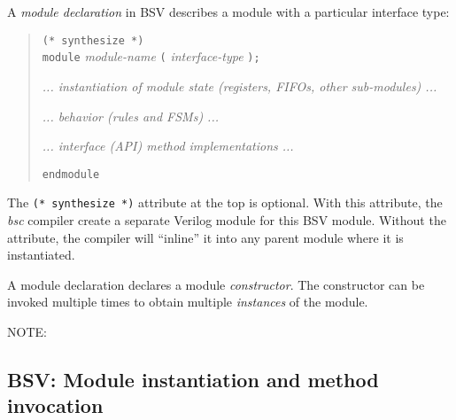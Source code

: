A \emph{module declaration} in BSV describes a module with a
particular interface type:

\begin{quote}
{\tt (* synthesize *)} \\
{\tt module} \emph{module-name} {\tt (} \emph{interface-type} {\tt );}

\hmm \emph{... instantiation of module state (registers, FIFOs, other sub-modules) ...}

\hmm \emph{... behavior (rules and FSMs) ...}

\hmm \emph{... interface (API) method implementations ...}

{\tt endmodule}
\end{quote}


The \verb|(* synthesize *)| attribute at the top is optional.  With
this attribute, the \emph{bsc} compiler create a separate Verilog
module for this BSV module.  Without the attribute, the compiler will
``inline'' it into any parent module where it is instantiated.


A module declaration declares a module \emph{constructor}. The
constructor can be invoked multiple times to obtain multiple
\emph{instances} of the module.

\vspace{2ex}

NOTE:


\subsection{BSV: Module instantiation and method invocation}

